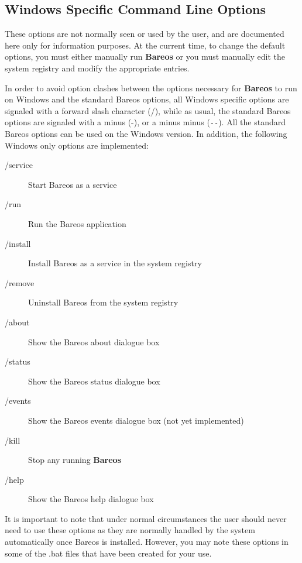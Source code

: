 \subsection{Windows Specific Command Line Options}

These options are not normally seen or used by the user, and are documented
here only for information purposes. At the current time, to change the default
options, you must either manually run {\bf Bareos} or you must manually edit
the system registry and modify the appropriate entries.

In order to avoid option clashes between the options necessary for {\bf
Bareos} to run on Windows and the standard Bareos options, all Windows
specific options are signaled with a forward slash character (/), while as
usual, the standard Bareos options are signaled with a minus (-), or a minus
minus (\verb:--:). All the standard Bareos options can be used on the Windows
version. In addition, the following Windows only options are implemented:

\begin{description}

\item [/service ]
   Start Bareos as a service

\item [/run ]
   Run the Bareos application

\item [/install ]
   Install Bareos as a service in the system registry

\item [/remove ]
   Uninstall Bareos from the system registry

\item [/about ]
   Show the Bareos about dialogue box

\item [/status ]
   Show the Bareos status dialogue box

\item [/events ]
   Show the Bareos events dialogue box (not  yet implemented)

\item [/kill ]
   Stop any running {\bf Bareos}

\item [/help ]
   Show the Bareos help dialogue box
\end{description}

It is important to note that under normal circumstances the user should never
need to use these options as they are normally handled by the system
automatically once Bareos is installed. However, you may note these options in
some of the .bat files that have been created for your use.
